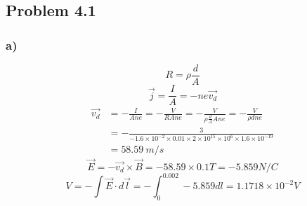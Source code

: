 \documentclass[../homework.tex]{subfiles}
\begin{document}
\subsection{Problem 4.1}
\subsubsection*{a)}
\begin{equation*}
    R = \rho \frac{d}{A}
\end{equation*}
\begin{equation*}
    \vec{j} = \frac{I}{A} = -ne \vec{v_d}
\end{equation*}
\begin{align*}
    \vec{v_d} &= -\frac{I}{Ane} = -\frac{V}{RAne} = -\frac{V}{\rho \frac{d}{A} A n e} = -\frac{V}{\rho d n e} \\
    &= -\frac{3}{-1.6 \times 10^{-2} \times 0.01 \times 2 \times 10^{15} \times 10^6 \times 1.6 \times 10^{-19}} \\
    &= 58.59\ m / s
\end{align*}
\begin{equation*}
    \vec{E} = -\vec{v_d} \times \vec{B} = -58.59 \times 0.1 T = -5.859 N / C
\end{equation*}
\begin{equation*}
    V = - \int \vec{E} \cdot d \vec{l} = - \int_{0}^{0.002} -5.859 dl = 1.1718 \times 10^{-2}V
\end{equation*}
\end{document}
